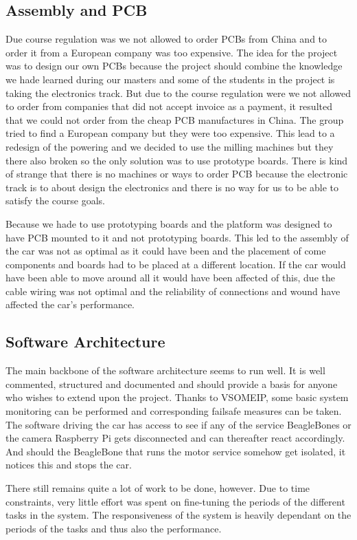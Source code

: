 \documentclass[11pt, titlepage]{article} %
\begin{document}
\subsection{Assembly and PCB}
Due course regulation was we not allowed to order PCBs from China and to order it from a European company was too expensive. 
The idea for the project was to design our own PCBs because the project should combine the knowledge we hade learned during our masters and some of the students in the project is taking the electronics track. But due to the course regulation were we not allowed to order from companies that did not accept invoice as a payment, it resulted that we could not order from the cheap PCB manufactures in China. The group tried to find a European company but they were too expensive. This lead to a redesign of the powering and we decided to use the milling machines but they there also broken so the only solution was to use prototype boards. There is kind of strange that there is no machines or ways to order PCB because the electronic track is to about design the electronics and there is no way for us to be able to satisfy the course goals. 

Because we hade to use prototyping boards and the platform was designed to have PCB mounted to it and not prototyping boards. This led to the assembly of the car was not as optimal as it could have been and the placement of come components and boards had to be placed at a different location. If the car would have been able to move around all it would have been affected of this, due the cable wiring was not optimal and the reliability of connections and wound have affected the car's performance. 

\subsection{Software Architecture}
The main backbone of the software architecture seems to run well. It is well commented, structured and documented
and should provide a basis for anyone who wishes to extend upon the project. Thanks to VSOMEIP, some basic system
monitoring can be performed and corresponding failsafe measures can be taken. The software driving the car has access
to see if any of the service BeagleBones or the camera Raspberry Pi gets disconnected and can thereafter react accordingly.
And should the BeagleBone that runs the motor service somehow get isolated, it notices this and stops the car.

There still remains quite a lot of work to be done, however. Due to time constraints, very little effort was
spent on fine-tuning the periods of the different tasks in the system. The responsiveness of the system is
heavily dependant on the periods of the tasks and thus also the performance.
\end{document}
